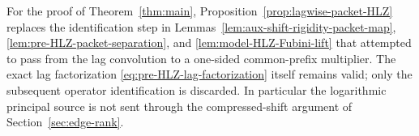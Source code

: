 \begin{remark}
\label{rem:one-sided-bridge-superseded}
For the proof of Theorem~\ref{thm:main}, Proposition~\ref{prop:lagwise-packet-HLZ}
replaces the identification step in Lemmas~\ref{lem:aux-shift-rigidity-packet-map},
\ref{lem:pre-HLZ-packet-separation}, and
\ref{lem:model-HLZ-Fubini-lift} that attempted to pass from the lag convolution
to a one-sided common-prefix multiplier.  The exact lag factorization
\eqref{eq:pre-HLZ-lag-factorization} itself remains valid; only the subsequent
operator identification is discarded.  In particular the logarithmic
principal source is not sent through the compressed-shift argument of
Section~\ref{sec:edge-rank}.
\end{remark}